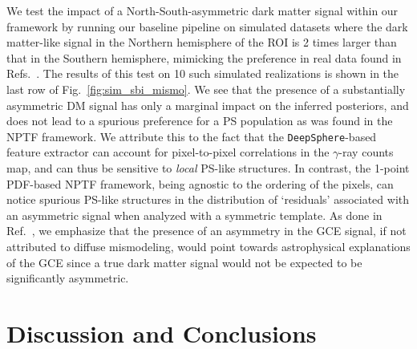 \documentclass[prd,aps,10pt,nofootinbib,twocolumn,superscriptaddress,preprintnumbers,balancelastpage,longbibliography]{revtex4-1}
\begin{document}
We test the impact of a North-South-asymmetric dark matter signal within our framework by running our baseline pipeline on simulated datasets where the dark matter-like signal in the Northern hemisphere of the ROI is 2 times larger than that in the Southern hemisphere, mimicking the preference in real data found in Refs.~\cite{Leane:2020nmi,Leane:2020pfc}. The results of this test on 10 such simulated realizations is shown in the last row of Fig.~\ref{fig:sim_sbi_mismo}. We see that the presence of a substantially asymmetric DM signal has only a marginal impact on the inferred posteriors, and does not lead to a spurious preference for a PS population as was found in the NPTF framework. We attribute this to the fact that the \texttt{DeepSphere}-based feature extractor can account for pixel-to-pixel correlations in the $\gamma$-ray counts map, and can thus be sensitive to \emph{local} PS-like structures. In contrast, the 1-point PDF-based NPTF framework, being agnostic to the ordering of the pixels, can notice spurious PS-like structures in the distribution of `residuals' associated with an asymmetric signal when analyzed with a symmetric template.
As done in Ref.~\cite{Buschmann:2020adf}, we emphasize that the presence of an asymmetry in the GCE signal, if not attributed to diffuse mismodeling, would point towards astrophysical explanations of the GCE since a true dark matter signal would not be expected to be significantly asymmetric.
    

\section{Discussion and Conclusions}
\label{sec:conclusion}
\end{document}
